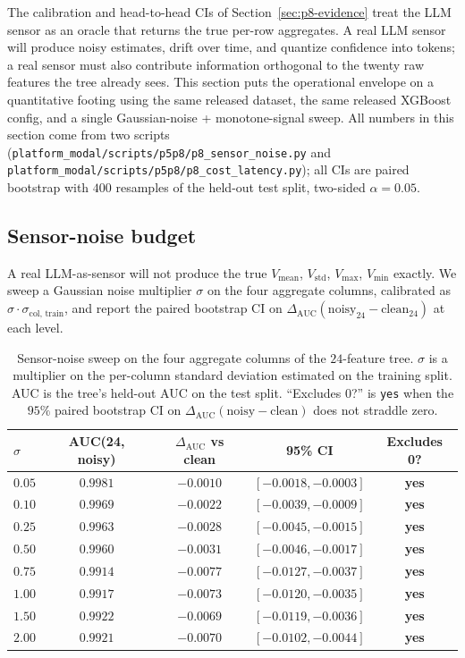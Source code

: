 \documentclass{article}
\providecommand{\secref}[1]{Section~\ref{#1}}
\begin{document}
The calibration and head-to-head CIs of \secref{sec:p8-evidence} treat the
LLM sensor as an oracle that returns the true per-row aggregates. A real
LLM sensor will produce noisy estimates, drift over time, and quantize
confidence into tokens; a real sensor must also contribute information
orthogonal to the twenty raw features the tree already sees. This section
puts the operational envelope on a quantitative footing using the same
released dataset, the same released XGBoost config, and a single
Gaussian-noise + monotone-signal sweep. All numbers in this section come
from two scripts (\texttt{platform\_modal/scripts/p5p8/p8\_sensor\_noise.py} and
\texttt{platform\_modal/scripts/p5p8/p8\_cost\_latency.py}); all CIs are paired bootstrap
with $400$ resamples of the held-out test split, two-sided $\alpha{=}0.05$.

\subsection{Sensor-noise budget}

A real LLM-as-sensor will not produce the true $V_{\text{mean}}$,
$V_{\text{std}}$, $V_{\text{max}}$, $V_{\text{min}}$ exactly. We sweep a
Gaussian noise multiplier $\sigma$ on the four aggregate columns,
calibrated as $\sigma \cdot \sigma_{\text{col, train}}$, and report the
paired bootstrap CI on
$\Delta_{\text{AUC}}(\text{noisy}_{24} - \text{clean}_{24})$ at each
level.

\begin{table}[t]
\centering
\small
\caption{Sensor-noise sweep on the four aggregate columns of the
$24$-feature tree. $\sigma$ is a multiplier on the per-column
standard deviation estimated on the training split. AUC is the tree's
held-out AUC on the test split. ``Excludes 0?'' is \texttt{yes} when the
$95\%$ paired bootstrap CI on $\Delta_{\text{AUC}}(\text{noisy} -
\text{clean})$ does not straddle zero. }
\label{tab:p8-noise-sweep}
\begin{tabular}{lcccc}
\toprule
$\sigma$ & AUC(24, noisy) & $\Delta_{\text{AUC}}$ vs clean & 95\% CI & Excludes 0? \\
\midrule
$0.05$ & $0.9981$ & $-0.0010$ & $[-0.0018, -0.0003]$ & \textbf{yes} \\
$0.10$ & $0.9969$ & $-0.0022$ & $[-0.0039, -0.0009]$ & \textbf{yes} \\
$0.25$ & $0.9963$ & $-0.0028$ & $[-0.0045, -0.0015]$ & \textbf{yes} \\
$0.50$ & $0.9960$ & $-0.0031$ & $[-0.0046, -0.0017]$ & \textbf{yes} \\
$0.75$ & $0.9914$ & $-0.0077$ & $[-0.0127, -0.0037]$ & \textbf{yes} \\
$1.00$ & $0.9917$ & $-0.0073$ & $[-0.0120, -0.0035]$ & \textbf{yes} \\
$1.50$ & $0.9922$ & $-0.0069$ & $[-0.0119, -0.0036]$ & \textbf{yes} \\
$2.00$ & $0.9921$ & $-0.0070$ & $[-0.0102, -0.0044]$ & \textbf{yes} \\
\bottomrule
\end{tabular}
\end{table}
\end{document}

